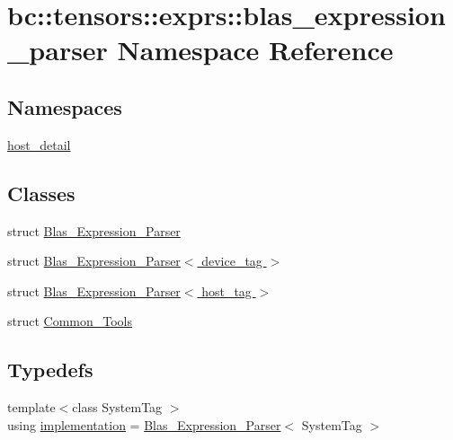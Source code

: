 \hypertarget{namespacebc_1_1tensors_1_1exprs_1_1blas__expression__parser}{}\section{bc\+:\+:tensors\+:\+:exprs\+:\+:blas\+\_\+expression\+\_\+parser Namespace Reference}
\label{namespacebc_1_1tensors_1_1exprs_1_1blas__expression__parser}
\subsection*{Namespaces}
\begin{DoxyCompactItemize}
\item 
 \hyperlink{namespacebc_1_1tensors_1_1exprs_1_1blas__expression__parser_1_1host__detail}{host\+\_\+detail}
\end{DoxyCompactItemize}
\subsection*{Classes}
\begin{DoxyCompactItemize}
\item 
struct \hyperlink{structbc_1_1tensors_1_1exprs_1_1blas__expression__parser_1_1Blas__Expression__Parser}{Blas\+\_\+\+Expression\+\_\+\+Parser}
\item 
struct \hyperlink{structbc_1_1tensors_1_1exprs_1_1blas__expression__parser_1_1Blas__Expression__Parser_3_01device__tag_01_4}{Blas\+\_\+\+Expression\+\_\+\+Parser$<$ device\+\_\+tag $>$}
\item 
struct \hyperlink{structbc_1_1tensors_1_1exprs_1_1blas__expression__parser_1_1Blas__Expression__Parser_3_01host__tag_01_4}{Blas\+\_\+\+Expression\+\_\+\+Parser$<$ host\+\_\+tag $>$}
\item 
struct \hyperlink{structbc_1_1tensors_1_1exprs_1_1blas__expression__parser_1_1Common__Tools}{Common\+\_\+\+Tools}
\end{DoxyCompactItemize}
\subsection*{Typedefs}
\begin{DoxyCompactItemize}
\item 
{\footnotesize template$<$class System\+Tag $>$ }\\using \hyperlink{namespacebc_1_1tensors_1_1exprs_1_1blas__expression__parser_a26796b5f514fb9e0f22e55339e432419}{implementation} = \hyperlink{structbc_1_1tensors_1_1exprs_1_1blas__expression__parser_1_1Blas__Expression__Parser}{Blas\+\_\+\+Expression\+\_\+\+Parser}$<$ System\+Tag $>$
\end{DoxyCompactItemize}


